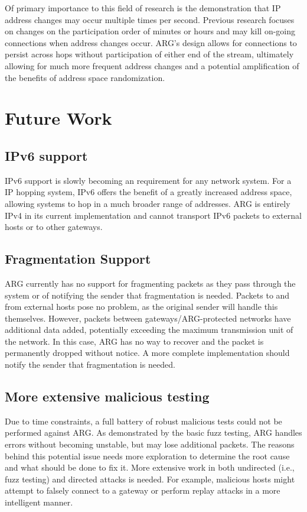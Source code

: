 \par Of primary importance to this field of research is the demonstration that \ac{IP} address changes may occur multiple times per second. Previous research focuses on changes on the participation order of minutes or hours and may kill on-going connections when address changes occur. ARG's design allows for connections to persist across hops without participation of either end of the stream, ultimately allowing for much more frequent address changes and a potential amplification of the benefits of address space randomization.

\section{Future Work}
\label{sec:future_work}
\subsection{IPv6 support}
\par \ac{IPv6} support is slowly becoming an requirement for any network system. For a \ac{IP} hopping system, \ac{IPv6} offers the benefit of a greatly increased address space, allowing systems to hop in a much broader range of addresses. \ac{ARG} is entirely \ac{IPv4} in its current implementation and cannot transport \ac{IPv6} packets to external hosts or to other gateways.

\subsection{Fragmentation Support}
\par \ac{ARG} currently has no support for fragmenting packets as they pass through the system or of notifying the sender that fragmentation is needed. Packets to and from external hosts pose no problem, as the original sender will handle this themselves. However, packets between gateways/\ac{ARG}-protected networks have additional data added, potentially exceeding the maximum transmission unit of the network. In this case, \ac{ARG} has no way to recover and the packet is permanently dropped without notice. A more complete implementation should notify the sender that fragmentation is needed.

\subsection{More extensive malicious testing}
\par Due to time constraints, a full battery of robust malicious tests could not be performed against \ac{ARG}. As demonstrated by the basic fuzz testing, \ac{ARG} handles errors without becoming unstable, but may lose additional packets. The reasons behind this potential issue needs more exploration to determine the root cause and what should be done to fix it. More extensive work in both undirected (i.e., fuzz testing) and directed attacks is needed. For example, malicious hosts might attempt to falsely connect to a gateway or perform replay attacks in a more intelligent manner.  

